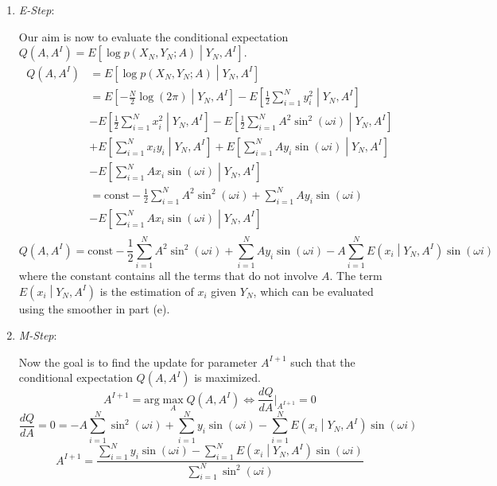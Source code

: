 \documentclass[a4paper, 11pt]{article}
\begin{document}
\begin{enumerate}
\item \textit{E-Step}:

Our aim is now to evaluate the conditional expectation $Q(A, A^I) = E\left[\log p(X_N, Y_N; A) \middle| Y_N, A^I \right]$.
\begin{equation}
\begin{split}
Q(A, A^I) & = E\left[\log p(X_N, Y_N; A) \middle| Y_N, A^I \right]\\
 & = E\left[ -\frac{N}{2}\log(2\pi) \middle|Y_N, A^I \right] - E\left[ \frac{1}{2}\sum_{i=1}^Ny_i^2 \middle|Y_N, A^I \right] \\
 & - E\left[ \frac{1}{2}\sum_{i=1}^Nx_i^2 \middle|Y_N, A^I \right] - E\left[ \frac{1}{2}\sum_{i=1}^N A^2\sin^2(\omega i) \middle|Y_N, A^I \right] \\
 & + E\left[ \sum_{i=1}^N x_iy_i \middle|Y_N, A^I \right] + E\left[ \sum_{i=1}^NAy_i\sin(\omega i) \middle|Y_N, A^I \right] \\
 & - E\left[ \sum_{i=1}^N Ax_i\sin(\omega i) \middle|Y_N, A^I \right] \\
 & = \text{const} - \frac{1}{2}\sum_{i=1}^N A^2\sin^2(\omega i) + \sum_{i=1}^NAy_i\sin(\omega i)\\
 & - E\left[ \sum_{i=1}^N Ax_i\sin(\omega i) \middle|Y_N, A^I \right]\\ 
\end{split}
\end{equation}
\begin{equation}
Q(A, A^I) = \text{const} - \frac{1}{2}\sum_{i=1}^N A^2\sin^2(\omega i) + \sum_{i=1}^NAy_i\sin(\omega i) - A\sum_{i=1}^N E\left(x_i \middle| Y_N, A^I \right)\sin(\omega i)
\end{equation}
where the constant contains all the terms that do not involve $A$. The term $E\left(x_i \middle| Y_N, A^I \right)$ is the estimation of $x_i$ given $Y_N$, which can be evaluated using the smoother in part (e). 

\item \textit{M-Step}:

Now the goal is to find the update for parameter $A^{I+1}$ such that the conditional expectation $Q(A, A^I)$ is maximized. 
\begin{equation}
A^{I+1} = \text{arg}\max_{A} Q(A, A^I) \iff \frac{dQ}{dA}\Bigg|_{A^{I+1}}=0
\end{equation}
\begin{equation}
\frac{dQ}{dA} = 0 = -A\sum_{i=1}^N\sin^2(\omega i) + \sum_{i=1}^Ny_i\sin(\omega i) - \sum_{i=1}^N E\left(x_i\middle| Y_N, A^I \right)\sin(\omega i)
\end{equation}
\begin{equation}
A^{I+1} = \frac{\sum_{i=1}^Ny_i\sin(\omega i) - \sum_{i=1}^N E\left(x_i\middle| Y_N, A^I \right)\sin(\omega i)}{\sum_{i=1}^N\sin^2(\omega i)}
\end{equation}
\end{enumerate}
\end{document}
